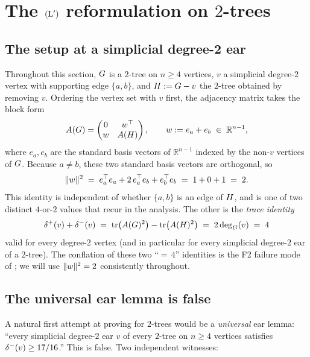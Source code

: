 \section{The \texorpdfstring{$(\mathrm{L}')$}{(L')} reformulation on \texorpdfstring{$2$}{2}-trees}\label{sec:lprime}

\subsection{The setup at a simplicial degree-2 ear}\label{sec:lprime:setup}

Throughout this section, $G$ is a $2$-tree on $n \ge 4$ vertices,
$v$ a simplicial degree-$2$ vertex with supporting edge $\{a, b\}$, and
$H := G - v$ the $2$-tree obtained by removing $v$. Ordering
the vertex set with $v$ first, the adjacency matrix takes the block
form
\[
A(G) = \begin{pmatrix} 0 & w^{\top} \\ w & A(H) \end{pmatrix},
\qquad
w := e_{a} + e_{b} \;\in\; \mathbb{R}^{n-1},
\]
where $e_{a}, e_{b}$ are the standard basis vectors of $\mathbb{R}^{n-1}$
indexed by the non-$v$ vertices of $G$. Because $a \ne b$, these
two standard basis vectors are orthogonal, so
\[
\|w\|^{2} \;=\; e_{a}^{\top}e_{a} + 2\,e_{a}^{\top}e_{b} + e_{b}^{\top}e_{b}
\;=\; 1 + 0 + 1 \;=\; 2.
\]
This identity is independent of whether $\{a, b\}$ is an edge of
$H$, and is one of two distinct $4$-or-$2$ values that recur in
the analysis. The other is the \emph{trace identity}
\[
\delta^{+}(v) + \delta^{-}(v) \;=\; \operatorname{tr}\bigl(A(G)^{2}\bigr)
                              - \operatorname{tr}\bigl(A(H)^{2}\bigr)
\;=\; 2 \deg_{G}(v) \;=\; 4
\]
valid for every degree-$2$ vertex (and in particular for every
simplicial degree-$2$ ear of a $2$-tree). The conflation of these two
``$=$\,$4$'' identities is the F2 failure mode of
; we will use $\|w\|^{2} = 2$ consistently
throughout.

\subsection{The universal ear lemma is false}\label{sec:lprime:universal-fails}

A natural first attempt at proving  for $2$-trees would
be a \emph{universal} ear lemma: ``every simplicial degree-$2$ ear $v$
of every $2$-tree on $n \ge 4$ vertices satisfies
$\delta^{-}(v) \ge 17/16$.'' This is false. Two independent witnesses:

